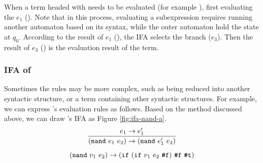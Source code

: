 When a term headed with  needs to be evaluated (for example ), first evaluating the $e_1$ (). Note that in this process, evaluating a subexpression requires running another automaton based on its syntax, while the outer automaton hold the state at $q_0$. According to the result of $e_1$ (), the IFA selects the branch ($e_3$). Then the result of $e_3$ () is the evaluation result of the term.

\subsubsection{IFA of }

Sometimes the rules may be more complex, such as being reduced into another syntactic structure, or a term containing other syntactic structures. For example, we can express 's evaluation rules as follows. Based on the method discussed above, we can draw 's IFA as Figure \ref{fig:ifa-nand-a}.
\[
\infer{(\m{nand}~e_1~e_2) \to (\m{nand}~e_1'~e_2)}{e_1 \to e_1'}
\]\[
(\mbox{\tt nand}~v_1~e_2) \to (\mbox{\tt if}~(\mbox{\tt if}~v_1~e_2~\mbox{\tt \#f})~\mbox{\tt \#f}~\mbox{\tt \#t})
\]



